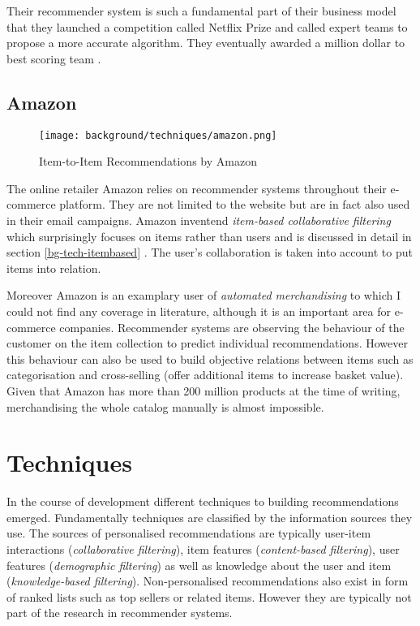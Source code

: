 Their recommender system is such a fundamental part of their business model that they launched a competition called Netflix Prize and called expert teams to propose a more accurate algorithm. They eventually awarded a million dollar to best scoring team \cite{netflix09}.

\subsection{Amazon}
\label{bg-adopt-amazon}

\begin{figure}[ht]
    \texttt{[image: background/techniques/amazon.png]}
    \caption{Item-to-Item Recommendations by Amazon}
    \label{fig:itembased-amazon}
\end{figure}

The online retailer Amazon relies on recommender systems throughout their e-commerce platform. They are not limited to the website but are in fact also used in their email campaigns. Amazon inventend \textit{item-based collaborative filtering} which surprisingly focuses on items rather than users and is discussed in detail in section \ref{bg-tech-itembased} \cite{linden03}. The user's collaboration is taken into account to put items into relation.

Moreover Amazon is an examplary user of \textit{automated merchandising} to which I could not find any coverage in literature, although it is an important area for e-commerce companies. Recommender systems are observing the behaviour of the customer on the item collection to predict individual recommendations. However this behaviour can also be used to build objective relations between items such as categorisation and cross-selling (offer additional items to increase basket value). Given that Amazon has more than 200 million products at the time of writing, merchandising the whole catalog manually is almost impossible.



\section{Techniques}

In the course of development different techniques to building recommendations emerged. Fundamentally techniques are classified by the information sources they use. The sources of personalised recommendations are typically user-item interactions (\textit{collaborative filtering}), item features (\textit{content-based filtering}), user features (\textit{demographic filtering}) as well as knowledge about the user and item (\textit{knowledge-based filtering}). Non-personalised recommendations also exist in form of ranked lists such as top sellers or related items. However they are typically not part of the research in recommender systems.

